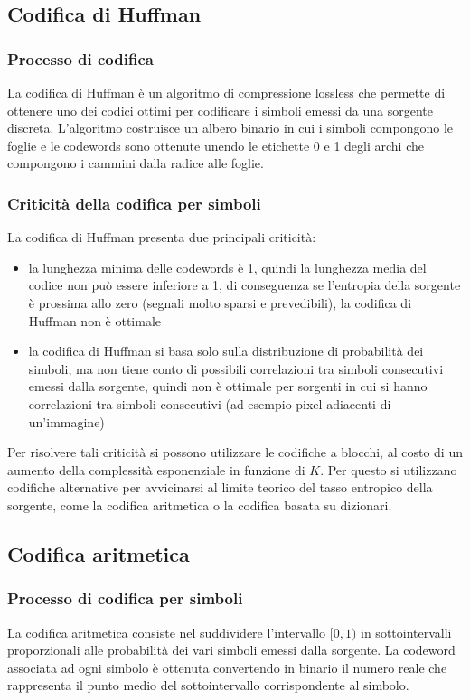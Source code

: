 \subsection{Codifica di Huffman}
\subsubsection*{Processo di codifica}
La codifica di Huffman è un algoritmo di compressione lossless che permette di ottenere uno dei codici ottimi per
codificare i simboli emessi da una sorgente discreta. L'algoritmo costruisce un albero binario in cui i simboli
compongono le foglie e le codewords sono ottenute unendo le etichette 0 e 1 degli archi che compongono i cammini
dalla radice alle foglie.

\subsubsection*{Criticità della codifica per simboli}
La codifica di Huffman presenta due principali criticità:
\begin{itemize}
	\item la lunghezza minima delle codewords è 1, quindi la lunghezza media del codice non può essere inferiore a 1,
	di conseguenza se l'entropia della sorgente è prossima allo zero (segnali molto sparsi e prevedibili), la codifica
	di Huffman non è ottimale
	\item la codifica di Huffman si basa solo sulla distribuzione di probabilità dei simboli, ma non tiene conto di
	possibili correlazioni tra simboli consecutivi emessi dalla sorgente, quindi non è ottimale per sorgenti in cui
	si hanno correlazioni tra simboli consecutivi (ad esempio pixel adiacenti di un'immagine)
\end{itemize}

\noindent
Per risolvere tali criticità si possono utilizzare le codifiche a blocchi, al costo di un aumento della complessità
esponenziale in funzione di \(K\). Per questo si utilizzano codifiche alternative per avvicinarsi al limite teorico
del tasso entropico della sorgente, come la codifica aritmetica o la codifica basata su dizionari.

\newpage


\subsection{Codifica aritmetica}
\subsubsection*{Processo di codifica per simboli}
La codifica aritmetica consiste nel suddividere l'intervallo \([0,1)\) in sottointervalli proporzionali alle probabilità
dei vari simboli emessi dalla sorgente. La codeword associata ad ogni simbolo è ottenuta convertendo in binario il numero
reale che rappresenta il punto medio del sottointervallo corrispondente al simbolo.


